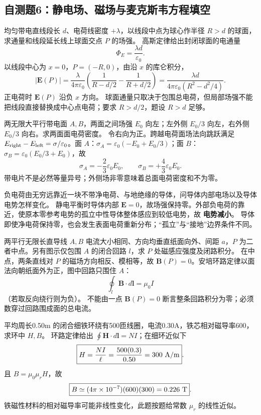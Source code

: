 \subsection{自测题6：静电场、磁场与麦克斯韦方程填空}

\problemtext 均匀带电直线段长 $d$、电荷线密度 $+\lambda$，以线段中点为球心作半径 $R>d$ 的球面，求通量和线段延长线上球面交点 $P$ 的场强。
\workings 高斯定律给出封闭球面的电通量
\[\boxed{\Phi_E=\frac{\lambda d}{\varepsilon_0}}.\]
以线段中心为 $x=0$，$P=(-R,0)$，由沿 $x$ 的库仑积分，
\[\boxed{|\bm E(P)|=\frac{\lambda}{4\pi\varepsilon_0}
\left(\frac1{R-d/2}-\frac1{R+d/2}\right)
=\frac{\lambda d}{4\pi\varepsilon_0(R^2-d^2/4)}}.\]
正电荷时 $\bm E(P)$ 沿负 $x$ 方向。
\crosscheck 球面通量只取决于包围总电荷，但局部场强不能把线段直接替换成中心点电荷；要求 $R>d/2$，题设 $R>d$ 足够。

\problemtext 两无限大平行带电面 $A,B$，两面之间场强 $E_0$ 向左；左外侧 $E_0/3$ 向左，右外侧 $E_0/3$ 向右。求两面面电荷密度。
\workings 令右向为正。跨越电荷面场法向跳跃满足 $E_{\rm right}-E_{\rm left}=\sigma/\varepsilon_0$。面 $A$：$\sigma_A=\varepsilon_0(-E_0+E_0/3)$；面 $B$：$\sigma_B=\varepsilon_0(E_0/3+E_0)$，故
\[\boxed{\sigma_A=-\frac23\varepsilon_0E_0,\qquad \sigma_B=+\frac43\varepsilon_0E_0}.\]
\crosscheck 带电片不是必然等量异号；外侧场非零意味着总面电荷密度和不为零。

\problemtext 负电荷由无穷远靠近一块不带净电荷、与地绝缘的导体，问导体内部电场以及导体电势怎样变化。
\workings 静电平衡时导体内部 $\boxed{\bm E=0}$，故场强保持零。外部负电荷的靠近，使原本零参考电势的孤立中性导体整体感应到较低电势，故 \textbf{电势减小}。
\crosscheck 导体即使净电荷保持零，也会发生表面电荷重新分布；“孤立”与“接地”边界条件不同。

\problemtext 两平行无限长直导线 $A,B$ 电流大小相同、方向均垂直纸面向外、间距 $a$，$P$ 为二者中点。另有图示仅包围 $A$ 的闭合回路 $l$，求 $P$ 处磁感应强度及闭路积分。
\workings 在中点，两条直线对 $P$ 的磁场方向相反、模相等，故 $\boxed{\bm B(P)=0}$。安培环路定律以面法向朝纸面外为正，图中回路只围住 $A$：
\[\boxed{\oint_l\bm B\cdot d\bm l=\mu_0 I}\]
（若取反向绕行则为负）。
\crosscheck 不能由一点 $\bm B(P)=0$ 断言整条回路积分为零；必须数穿过回路围成面的总电流。

\problemtext 平均周长0.50m 的闭合细铁环绕有500匝线圈，电流0.30A，铁芯相对磁导率600，求环中 $H,B$。
\workings 环路定律给出 $\oint\bm H\cdot d\bm l=NI$；在细环近似下
\[\boxed{H=\frac{NI}{\ell}=\frac{500(0.3)}{0.50}=300\ {\rm A/m}}.\]
且 $B=\mu_0\mu_rH$，故
\[\boxed{B\simeq(4\pi\times10^{-7})(600)(300)=0.226\ {\rm T}}.\]
\crosscheck 铁磁性材料的相对磁导率可能非线性变化，此题按题给常数 $\mu_r$ 的线性近似。

